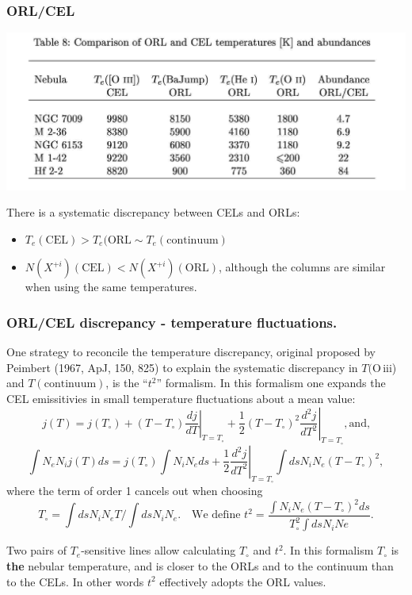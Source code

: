 \begin{frame}\frametitle{ORL/CEL}

\begin{center}
      \includegraphics[width=\textwidth,height=!]{./C/orl_cel_table.jpg}
\end{center}

There is a systematic discrepancy between CELs and ORLs:\begin{itemize}
\item $T_e(\mathrm{CEL}) > T_e(\mathrm{ORL} \sim T_e(\mathrm{continuum})$
 
\item $N(X^{+i})(\mathrm{CEL}) < N(X^{+i})(\mathrm{ORL})$, although
the columns are similar when using the same temperatures.
\end{itemize}

\end{frame}
\begin{frame}\frametitle{ORL/CEL discrepancy  -
temperature fluctuations.  }

One strategy to reconcile the temperature discrepancy, original
proposed by Peimbert (1967, ApJ, 150, 825) to explain the systematic
discrepancy in $T($O\,{\sc iii}) and $T(\mathrm{continuum})$, is the
``$t^2$'' formalism. In this formalism one expands the CEL emissitivies
in small temperature fluctuations about a mean value:
\[
j(T) = j(T_\circ) + (T-T_\circ)
\left. \frac{dj}{dT}\right|_{T=T_\circ} + \left. \frac{1}{2} (T-T_\circ)^2
\frac{d^2j}{dT^2}\right|_{T=T_\circ}, \text{and,}
\]
\[
\int N_e N_i j(T) ds = j(T_\circ) \int N_i N_e ds + \left. \frac{1}{2}
\frac{d^2j}{dT^2}\right|_{T=T_\circ} \int ds N_i N_e (T-T_\circ)^2,
\]
where the term of order 1 cancels out when choosing\[
T_\circ = \int ds N_i N_e T / \int ds N_i N_e \text{. ~~We define } 
t^2 = \frac{\int N_i N_e (T-T_\circ)^2 ds}{T_\circ^2  \int
ds N_i Ne }.\]

Two pairs of $T_e$-sensitive lines allow calculating $T_\circ$ and
$t^2$. In this formalism $T_\circ$ is {\bf the }  nebular temperature,
and is closer to the ORLs and to the continuum than to the CELs. In
other words $t^2$ effectively adopts the ORL values. 

\end{frame}
